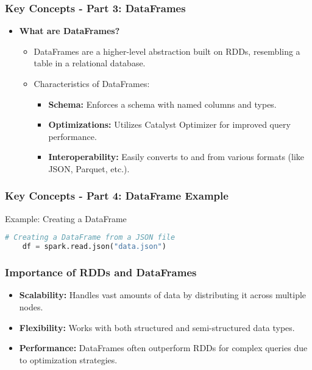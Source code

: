 \documentclass[aspectratio=169]{beamer}
\begin{document}
\begin{frame}[fragile]
    \frametitle{Key Concepts - Part 3: DataFrames}
    \begin{itemize}
        \item \textbf{What are DataFrames?}
        \begin{itemize}
            \item DataFrames are a higher-level abstraction built on RDDs, resembling a table in a relational database.
            \item Characteristics of DataFrames:
            \begin{itemize}
                \item \textbf{Schema:} Enforces a schema with named columns and types.
                \item \textbf{Optimizations:} Utilizes Catalyst Optimizer for improved query performance.
                \item \textbf{Interoperability:} Easily converts to and from various formats (like JSON, Parquet, etc.).
            \end{itemize}
        \end{itemize}
    \end{itemize}
\end{frame}

\begin{frame}[fragile]
    \frametitle{Key Concepts - Part 4: DataFrame Example}
    \begin{block}{Example: Creating a DataFrame}
    \begin{lstlisting}[language=Python]
    # Creating a DataFrame from a JSON file
    df = spark.read.json("data.json")
    \end{lstlisting}
    \end{block}
\end{frame}

\begin{frame}[fragile]
    \frametitle{Importance of RDDs and DataFrames}
    \begin{itemize}
        \item \textbf{Scalability:} Handles vast amounts of data by distributing it across multiple nodes.
        \item \textbf{Flexibility:} Works with both structured and semi-structured data types.
        \item \textbf{Performance:} DataFrames often outperform RDDs for complex queries due to optimization strategies.
    \end{itemize}
\end{frame}
\end{document}
